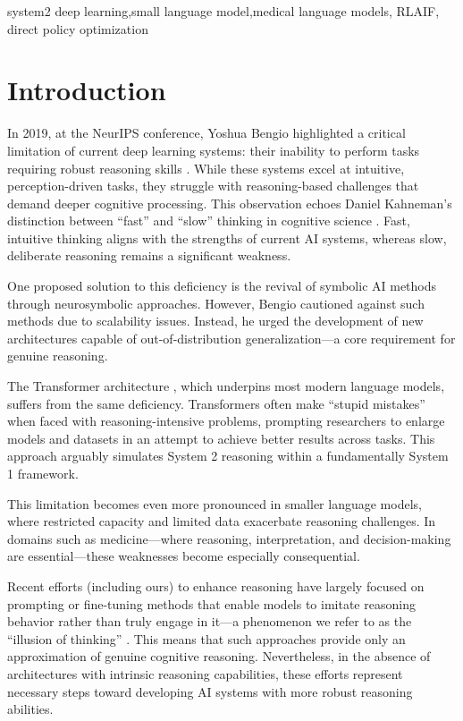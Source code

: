 \documentclass[conference]{IEEEtran}
\begin{document}
	\begin{IEEEkeywords}
		system2 deep learning,small language model,medical language models, RLAIF, direct policy optimization
	\end{IEEEkeywords}
	
	\section{Introduction}
In 2019, at the NeurIPS conference, Yoshua Bengio highlighted a critical limitation of current deep learning systems: their inability to perform tasks requiring robust reasoning skills
\cite{b1}.
While these systems excel at intuitive, perception-driven tasks, they struggle with reasoning-based challenges that demand deeper cognitive processing. This observation echoes Daniel Kahneman’s distinction between “fast” and “slow” thinking in cognitive science
\cite{b2}.
Fast, intuitive thinking aligns with the strengths of current AI systems, whereas slow, deliberate reasoning remains a significant weakness.

One proposed solution to this deficiency is the revival of symbolic AI methods through neurosymbolic approaches. However, Bengio cautioned against such methods due to scalability issues. Instead, he urged the development of new architectures capable of out-of-distribution generalization—a core requirement for genuine reasoning.

The Transformer architecture
\cite{b3}, which underpins most modern language models, suffers from the same deficiency. Transformers often make “stupid mistakes” when faced with reasoning-intensive problems, prompting researchers to enlarge models and datasets in an attempt to achieve better results across tasks. This approach arguably simulates System 2 reasoning within a fundamentally System 1 framework.

This limitation becomes even more pronounced in smaller language models, where restricted capacity and limited data exacerbate reasoning challenges. In domains such as medicine—where reasoning, interpretation, and decision-making are essential—these weaknesses become especially consequential.

Recent efforts (including ours) to enhance reasoning have largely focused on prompting or fine-tuning methods that enable models to imitate reasoning behavior rather than truly engage in it—a phenomenon we refer to as the “illusion of thinking” \cite{b4}. This means that such approaches provide only an approximation of genuine cognitive reasoning. Nevertheless, in the absence of architectures with intrinsic reasoning capabilities, these efforts represent necessary steps toward developing AI systems with more robust reasoning abilities.
\end{document}
